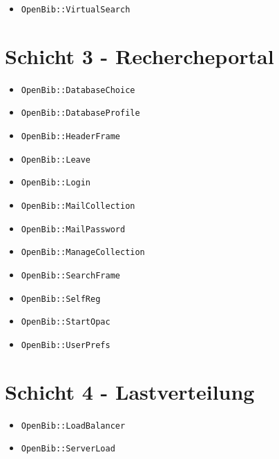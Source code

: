 \documentclass[11pt, twoside, a4paper, BCOR8mm, DIV12, bibtotoc,idxtotoc]{scrbook}
\begin{document}
\begin{itemize}
\item \texttt{OpenBib::VirtualSearch}
\end{itemize}

\section{Schicht 3 - Rechercheportal}

\begin{itemize}
\item \texttt{OpenBib::DatabaseChoice}
\item \texttt{OpenBib::DatabaseProfile}
\item \texttt{OpenBib::HeaderFrame}
\item \texttt{OpenBib::Leave}
\item \texttt{OpenBib::Login}
\item \texttt{OpenBib::MailCollection}
\item \texttt{OpenBib::MailPassword}
\item \texttt{OpenBib::ManageCollection}
\item \texttt{OpenBib::SearchFrame}
\item \texttt{OpenBib::SelfReg}
\item \texttt{OpenBib::StartOpac}
\item \texttt{OpenBib::UserPrefs}
\end{itemize}

\section{Schicht 4 - Lastverteilung}

\begin{itemize}
\item \texttt{OpenBib::LoadBalancer}
\item \texttt{OpenBib::ServerLoad}
\end{itemize}
\end{document}
